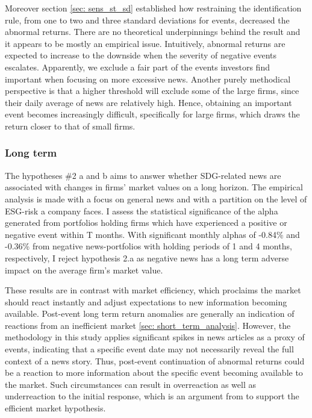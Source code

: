 Moreover section \ref{sec: sens_st_sd} established how restraining the identification rule, from one to two and three standard deviations for events, decreased the abnormal returns. There are no theoretical underpinnings behind the result and it appears to be mostly an empirical issue. Intuitively, abnormal returns are expected to increase to the downside when the severity of negative events escalates. Apparently, we exclude a fair part of the events investors find important when focusing on more excessive news. Another purely methodical perspective is that a higher threshold will exclude some of the large firms, since their daily average of news are relatively high. Hence, obtaining an important event becomes increasingly difficult, specifically for large firms, which draws the return closer to that of small firms.  



\subsubsection{Long term}

The hypotheses \#2 a and b aims to answer whether SDG-related news are associated with changes in firms' market values on a long horizon. The empirical analysis is made with a focus on general news and with a partition on the level of ESG-risk a company faces. I assess the statistical significance of the alpha generated from portfolios holding firms which have experienced a positive or negative event within T months. With significant monthly alphas of -0.84\% and -0.36\% from negative news-portfolios with holding periods of 1 and 4 months, respectively, I reject hypothesis 2.a as negative news has a long term adverse impact on the average firm's market value.   

These results are in contrast with market efficiency, which proclaims the market should react instantly and adjust expectations to new information becoming available. Post-event long term return anomalies are generally an indication of reactions from an inefficient market \ref{sec: short_term_analysis}. However, the methodology in this study applies significant spikes in news articles as a proxy of events, indicating that a specific event date may not necessarily reveal the full context of a news story. Thus, post-event continuation of abnormal returns could be a reaction to more information about the specific event becoming available to the market. Such circumstances can result in overreaction as well as underreaction to the initial response, which is an argument from \cite{fama1998_events} to support the efficient market hypothesis.   

